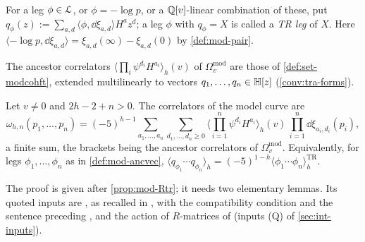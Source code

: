 \begin{defn}
\label{def:mod-ancvec}
For a leg $\phi\in\mathcal{L}$, or $\phi=-\log p$, or a $\mathbb{Q}[v]$-linear combination of these, put $q_\phi(z):=\sum_{a,d}\langle\phi,\dd\xi_{a,d}\rangle H^az^d$; a leg $\phi$ with $q_\phi=X$ is called a \emph{TR leg} of $X$. Here $\langle-\log p,\dd\xi_{a,d}\rangle=\xi_{a,d}(\infty)-\xi_{a,d}(0)$ by \cref{def:mod-pair}.
\end{defn}

The ancestor correlators $\langle\prod_i\psi^{d_i}H^{a_i}\rangle_h(v)$ of $\Omega^{\mathrm{mod}}_v$ are those of \cref{def:set-modcohft}, extended multilinearly to vectors $q_1,\dots,q_n\in\mathbb{H}[z]$ (\cref{conv:tra-forms}).

\begin{thm}
\label{thm:mod-tr}
Let $v\neq 0$ and $2h-2+n>0$. The correlators of the model curve are
\begin{equation}
\label{eq:mod-tr}
\omega_{h,n}(p_1,\dots,p_n)=(-5)^{h-1}\sum_{a_1,\dots,a_n}\sum_{d_1,\dots,d_n\geq 0}\Big\langle\prod_{i=1}^n\psi^{d_i}H^{a_i}\Big\rangle_h(v)\,\prod_{i=1}^n\dd\xi_{a_i,d_i}(p_i),
\end{equation}
a finite sum, the brackets being the ancestor correlators of $\Omega^{\mathrm{mod}}_v$. Equivalently, for legs $\phi_1,\dots,\phi_n$ as in \cref{def:mod-ancvec}, $\langle q_{\phi_1}\cdots q_{\phi_n}\rangle_h=(-5)^{1-h}\langle\phi_1\cdots\phi_n\rangle^{\mathrm{TR}}_h$.
\end{thm}

The proof is given after \cref{prop:mod-Rtr}; it needs two elementary lemmas. Its quoted inputs are \cite[Thm.~4.1]{DuninBarkowski:2012bw}, as recalled in \cite[\S2.6]{Dunin-Barkowski:2015caa}, with the compatibility condition \cite[Prop.~4.3 (1)]{Dunin-Barkowski:2015caa} and the sentence preceding \cite[Thm.~8.1]{Dunin-Barkowski:2015caa}, and the action of $R$-matrices of \cite{PPZ15} (inputs (Q) of \cref{sec:int-inputs}).


